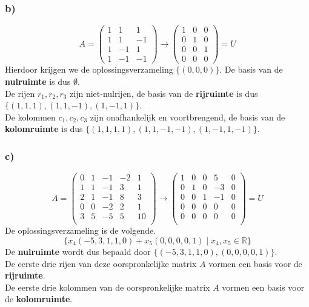 \documentclass[lineaire_algebra_oplossingen.tex]{subfiles}
\begin{document}
\subsubsection*{b)}
\[
A =
\begin{pmatrix}
  1 & 1 & 1\\
  1 & 1 & -1\\
  1 & -1 & 1\\
  1 & -1 & -1
\end{pmatrix}
\longrightarrow
\begin{pmatrix}
  1 & 0 & 0\\
  0 & 1 & 0\\
  0 & 0 & 1\\
  0 & 0 & 0
\end{pmatrix}
= U
\]
Hierdoor krijgen we de oplossingsverzameling $\{(0,0,0)\}$. De basis van de \textbf{nulruimte} is dus $\emptyset$.\\
De rijen $r_1, r_2, r_3$ zijn niet-nulrijen, de basis van de \textbf{rijruimte} is dus $\{(1,1,1), (1,1,-1), (1,-1,1)\}$.\\
De kolommen $c_1, c_2, c_3$ zijn onafhankelijk en voortbrengend, de basis van de \textbf{kolomruimte} is dus $\{(1,1,1,1), (1,1,-1,-1), (1,-1,1,-1)\}$.

\subsubsection*{c)}
\[
A =
\begin{pmatrix}
0 & 1 & -1 &  -2 & 1 \\
1 & 1 & -1 & 3   & 1 \\
2 & 1 & -1 & 8   & 3 \\
0 & 0 & -2 & 2   & 1 \\
3 & 5 & -5 & 5   & 10\\
\end{pmatrix}
\longrightarrow
\begin{pmatrix}
1 & 0 & 0 & 5 & 0 \\
0 & 1 & 0 & -3& 0 \\
0 & 0 & 1 & -1& 0 \\
0 & 0 & 0 & 0 & 0 \\
0 & 0 & 0 & 0 & 0 \\
\end{pmatrix}
= U
\]
De oplossingsverzameling is de volgende.
\[
\{ x_4(-5,3,1,1,0) + x_5(0,0,0,0,1) \mid x_4, x_5 \in \mathbb{R}\}
\]
De \textbf{nulruimte} wordt dus bepaald door $\{ (-5,3,1,1,0) , (0,0,0,0,1) \}$.\\
De eerste drie rijen van deze oorspronkelijke matrix $A$ vormen een basis voor de \textbf{rijruimte}.\\
De eerste drie kolommen van de oorspronkelijke matrix $A$ vormen een basis voor de \textbf{kolomruimte}.
\end{document}
